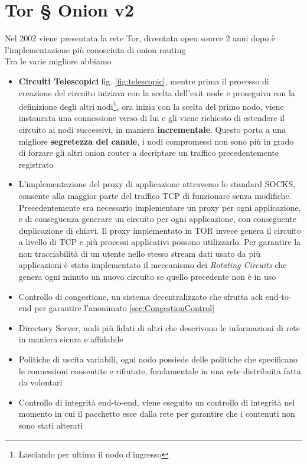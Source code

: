 \newpage
\chapter{Tor § Onion v2}
\label{chap:Capitolo2}
Nel 2002 viene presentata la rete Tor, diventata open source 2 anni dopo è l'implementazione più conosciuta di onion routing \\
Tra le varie migliore abbiamo 
\begin{itemize}
    \item \textbf{Circuiti Telescopici} fig. \ref{fig:telescopic}, mentre prima il processo di creazione del circuito iniziava con la scelta dell'exit node e proseguiva con la definizione degli altri nodi\footnote{Lasciando per ultimo il nodo d'ingresso}, ora inizia con la scelta del primo nodo, viene instaurata una connessione verso di lui e gli viene richiesto di estendere il circuito ai nodi successivi, in maniera \textbf{incrementale}. Questo porta a una migliore \textbf{segretezza del canale}, i nodi compromessi non sono più in grado di forzare gli altri onion router a decriptare un traffico precedentemente registrato
    
    \item L'implementazione del proxy di applicazione attraverso lo standard SOCKS, consente alla maggior parte del traffico TCP di funzionare senza modifiche. Precedentemente era necessario implementare un proxy per ogni applicazione, e di conseguenza generare un circuito per ogni applicazione, con conseguente duplicazione di chiavi. Il proxy implementato in TOR invece genera il circuito a livello di TCP e più processi applicativi possono utilizzarlo. Per garantire la non tracciabilità di un utente nello stesso stream dati usato da più applicazioni è stato implementato il meccanismo dei \emph{Rotating Circuits} che genera ogni minuto un nuovo circuito se quello precedente non è in uso
    
    \item Controllo di congestione, un sistema decentralizzato che sfrutta ack end-to-end per garantire l'anonimato \ref{sec:CongestionControl}
    \item Directory Server, nodi più fidati di altri che descrivono le informazioni di rete in maniera sicura e affidabile
    \item Politiche di uscita variabili, ogni nodo possiede delle politiche che specificano le connessioni consentite e rifiutate, fondamentale in una rete distribuita fatta da volontari
    \item Controllo di integrità end-to-end, viene eseguito un controllo di integrità nel momento in cui il pacchetto esce dalla rete per garantire che i contenuti non sono stati alterati
\end{itemize}


